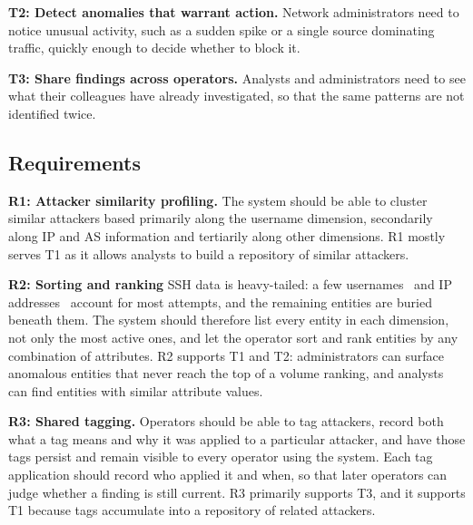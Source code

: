 \documentclass[10pt,twocolumn]{article}   %
\begin{document}
\textbf{T2: Detect anomalies that warrant action.} Network administrators need to notice unusual activity, such as a sudden spike or a single source dominating traffic, 
quickly enough to decide whether to block it.

\textbf{T3: Share findings across operators.} Analysts and administrators need to see what their colleagues have already investigated, so that the 
same patterns are not identified twice.

\subsection{Requirements}
\label{sec:reqs}


\textbf{R1: Attacker similarity profiling.} The system should be able to cluster similar attackers based primarily along the username 
dimension, secondarily along IP and AS information and tertiarily along other dimensions. R1 mostly serves T1 as it allows analysts to build a repository of similar attackers.

\textbf{R2: Sorting and ranking} SSH data is heavy-tailed: a few usernames~\cite{owens2008study} and IP addresses~\cite{wu2020mining}  account for most attempts, 
and the remaining entities are buried beneath them. The system should therefore list every entity in each dimension, not only the most active ones, 
and let the operator sort and rank entities by any combination of attributes. R2 supports T1 and T2: administrators can surface anomalous entities that never reach the 
top of a volume ranking, and analysts can find entities with similar attribute values.



\textbf{R3: Shared tagging.} Operators should be able to tag attackers, record both what a tag means and why it was applied to a particular attacker, 
and have those tags persist and remain visible to every operator using the system. Each tag application should record who applied it and when, 
so that later operators can judge whether a finding is still current. R3 primarily supports T3, and it supports T1 because tags accumulate into a repository of related attackers.
\end{document}
